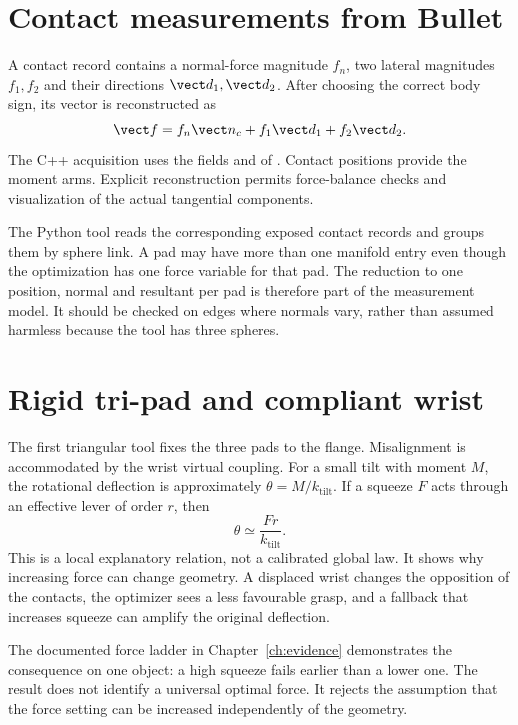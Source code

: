 \section{Contact measurements from Bullet}

A contact record contains a normal-force magnitude $f_n$, two lateral magnitudes $f_1,f_2$ and their directions $\vect d_1,\vect d_2$. After choosing the correct body sign, its vector is reconstructed as
\begin{equation}
\vect f=f_n\vect n_c+f_1\vect d_1+f_2\vect d_2.
\label{eq:bullet-contact}
\end{equation}
The C++ acquisition uses the fields  and  of . Contact positions provide the moment arms. Explicit reconstruction permits force-balance checks and visualization of the actual tangential components.

The Python tool reads the corresponding exposed contact records and groups them by sphere link. A pad may have more than one manifold entry even though the optimization has one force variable for that pad. The reduction to one position, normal and resultant per pad is therefore part of the measurement model. It should be checked on edges where normals vary, rather than assumed harmless because the tool has three spheres.

\section{Rigid tri-pad and compliant wrist}

The first triangular tool fixes the three pads to the flange. Misalignment is accommodated by the wrist virtual coupling. For a small tilt with moment $M$, the rotational deflection is approximately $\theta=M/k_{\mathrm{tilt}}$. If a squeeze $F$ acts through an effective lever of order $r$, then
\begin{equation}
\theta\simeq\frac{Fr}{k_{\mathrm{tilt}}}.
\label{eq:force-tilt}
\end{equation}
This is a local explanatory relation, not a calibrated global law. It shows why increasing force can change geometry. A displaced wrist changes the opposition of the contacts, the optimizer sees a less favourable grasp, and a fallback that increases squeeze can amplify the original deflection.

The documented force ladder in Chapter~\ref{ch:evidence} demonstrates the consequence on one object: a high squeeze fails earlier than a lower one. The result does not identify a universal optimal force. It rejects the assumption that the force setting can be increased independently of the geometry.

